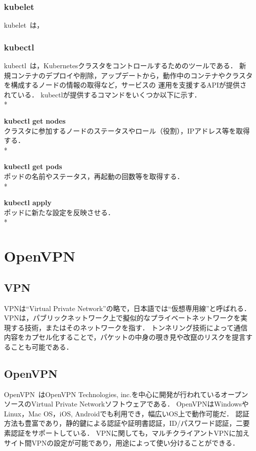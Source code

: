 \subsubsection{kubelet}

kubelet~\cite{kubelet}は，

\subsubsection{kubectl}

kubectl~\cite{kubectl}は，Kubernetesクラスタをコントロールするためのツールである．
新規コンテナのデプロイや削除，アップデートから，動作中のコンテナやクラスタを構成するノードの情報の取得など，サービスの
運用を支援するAPIが提供されている．
kubectlが提供するコマンドをいくつか以下に示す．\\*

{\bf kubectl get nodes}\\
クラスタに参加するノードのステータスやロール（役割），IPアドレス等を取得する．\\*

{\bf kubectl get pods}\\
ポッドの名前やステータス，再起動の回数等を取得する．\\*

{\bf kubectl apply}\\
ポッドに新たな設定を反映させる．\\*

\section{OpenVPN}
\label{background:openvpn}

\subsection{VPN}

VPNは``Virtual Private Network''の略で，日本語では``仮想専用線''と呼ばれる．
VPNは，パブリックネットワーク上で擬似的なプライベートネットワークを実現する技術，またはそのネットワークを指す．
トンネリング技術によって通信内容をカプセル化することで，パケットの中身の覗き見や改竄のリスクを提言することも可能である．

\subsection{OpenVPN}

OpenVPN~\cite{OpenVPN}はOpenVPN Technologies, inc.を中心に開発が行われているオープンソースのVirtual Private Networkソフトウェアである．
OpenVPNはWindowsやLinux，Mac OS，iOS, Androidでも利用でき，幅広いOS上で動作可能だ．
認証方法も豊富であり，静的鍵による認証や証明書認証，ID/パスワード認証，二要素認証をサポートしている．
VPNに関しても，マルチクライアントVPNに加えサイト間VPNの設定が可能であり，用途によって使い分けることができる．